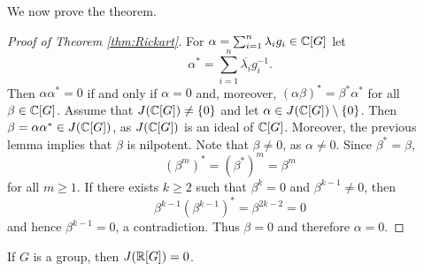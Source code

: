 We now prove the theorem. 

\begin{proof}[Proof of Theorem \ref{thm:Rickart}]
    For $\alpha=\sum_{i=1}^n\lambda_ig_i\in\mathbb{C}[G]$ let 
    \[
    \alpha^*=\sum_{i=1}^n\overline{\lambda_i}g_i^{-1}.
    \]
    Then $\alpha\alpha^*=0$ if and only if $\alpha=0$ and, moreover, 
    $(\alpha\beta)^*=\beta^*\alpha^*$ for all $\beta\in\mathbb{C}[G]$. 
    Assume that $J(\mathbb{C}[G])\ne\{0\}$ and let $\alpha\in J(\mathbb{C}[G])\setminus\{0\}$. Then
    $\beta=\alpha\alpha^*\in J(\mathbb{C}[G])$, as $J(\mathbb{C}[G])$ is an ideal of $\mathbb{C}[G]$. Moreover, the previous 
    lemma implies that $\beta$ is nilpotent. Note that $\beta\ne 0$, as $\alpha\ne0$. Since $\beta^*=\beta$,  
    \[
    (\beta^m)^*=(\beta^*)^m=\beta^m
    \]
    for all $m\geq1$. If there exists $k\geq2$ such that $\beta^k=0$ and $\beta^{k-1}\ne 0$, then
    \[
    \beta^{k-1}\left(\beta^{k-1}\right)^*=\beta^{2k-2}=0
    \]
    and hence $\beta^{k-1}=0$, a contradiction. Thus $\beta=0$ and therefore $\alpha=0$. 
\end{proof}

\begin{exercise}
	If $G$ is a group, then $J(\mathbb{R}[G])=0$. 
\end{exercise}






